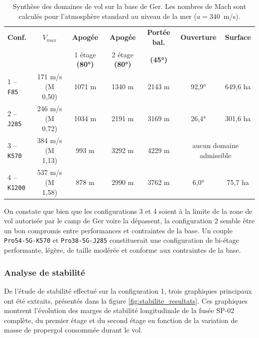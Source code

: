 \begin{table}[H]
    \centering
    \footnotesize
    \setlength{\tabcolsep}{10pt}
    \begin{tabular}{l|c|c|c|c|c|c}
        \hline
        \textbf{Conf.} & \textbf{$V_{max}$} & \textbf{Apogée} & \textbf{Apogée}
        & \textbf{Portée bal.} & \textbf{Ouverture} & \textbf{Surface} \\
        & & 1\ier{} étage \textbf{(80°)} & 2\ieme{} étage \textbf{(80°)} & \textbf{(45°)} & & \\
        \hline
        1 -- \texttt{F85}   & 171 m/s (M 0,50) & 1071 m & 1340 m & 2143 m & 92,9° & 649,6 ha \\
        2 -- \texttt{J285}  & 246 m/s (M 0,72) & 1034 m & 2191 m & 3169 m & 26,4° & 301,6 ha \\
        3 -- \texttt{K570}  & 384 m/s (M 1,13) &  993 m & 3292 m & 4229 m & \multicolumn{2}{c}{aucun domaine admissible} \\
        4 -- \texttt{K1200} & 537 m/s (M 1,58) &  878 m & 2990 m & 3762 m & 6,0°  & 75,7 ha \\
        \hline
    \end{tabular}
    \caption{Synthèse des domaines de vol sur la base de Ger. Les nombres de Mach sont calculés pour
    l'atmosphère standard au niveau de la mer ($a = 340$~m/s).}
    \label{tab:synthese_domaine_vol}
\end{table}

On constate que bien que les configurations 3 et 4 soient à la limite de la zone de vol autorisée par le camp de Ger voire la
dépassent, la configuration 2 semble être un bon compromis entre performances et contraintes de la base. Un couple
\texttt{Pro54-5G-K570} et \texttt{Pro38-5G-J285} constituerait une configuration de bi-étage performante, légère, de taille
modérée et conforme aux contraintes de la base.

\newpage

\subsubsection{Analyse de stabilité}

De l'étude de stabilité effectué sur la configuration 1, trois graphiques principaux ont été extraits, présentés dans la figure
\ref{fig:stabilite_resultats}. Ces graphiques montrent l'évolution des marges de stabilité longitudinale de la fusée SP-02
complète, du premier étage et du second étage en fonction de la variation de masse de propergol consommée durant le vol.\\

